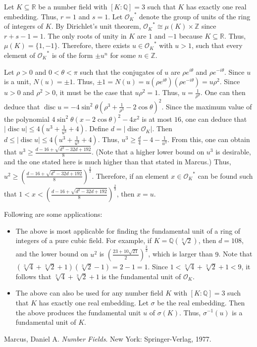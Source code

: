 \documentclass[12pt]{article}
\begin{document}
Let $K \subseteq \mathbb{R}$ be a number field with $[K\!:\!\mathbb{Q}]=3$ such that $K$ has exactly one real embedding.  Thus, $r=1$ and $s=1$.  Let ${\mathcal{O}_K}^*$ denote the group of units of the ring of integers of $K$.  By Dirichlet's unit theorem, ${\mathcal{O}_K}^* \cong \mu(K) \times \mathbb{Z}$ since $r+s-1=1$.  The only roots of unity in $K$ are $1$ and $-1$ because $K \subseteq \mathbb{R}$.  Thus, $\mu(K)=\{1,-1\}$.  Therefore, there exists $u \in {\mathcal{O}_K}^*$ with $u>1$, such that every element of ${\mathcal{O}_K}^*$ is of the form $\pm u^n$ for some $n \in \mathbb{Z}$.

Let $\rho>0$ and $0<\theta<\pi$ such that the conjugates of $u$ are $\rho e^{i\theta}$ and $\rho e^{-i\theta}$.  Since $u$ is a unit, $N(u)=\pm 1$.  Thus, $\pm 1=N(u)=u(\rho e^{i\theta})(\rho e^{-i\theta})=u\rho^2$.  Since $u>0$ and $\rho^2>0$, it must be the case that $u\rho^2=1$.  Thus, $\displaystyle u=\frac{1}{\rho^2}$.  One can then deduce that $\displaystyle \operatorname{disc}u=-4\sin^2\theta\left(\rho^3+\frac{1}{\rho^3}- 2\cos\theta\right)^2$.  Since the maximum value of the polynomial $4\sin^2\theta(x-2\cos\theta)^2-4x^2$ is at most $16$, one can deduce that $\displaystyle |\operatorname{disc}u| \le 4\left(u^3+\frac{1}{u^3}+4\right)$.  Define $d=|\operatorname{disc}\mathcal{O}_K|$.  Then $\displaystyle d\le|\operatorname{disc}u| \le 4\left(u^3+\frac{1}{u^3}+4\right)$.  Thus, $\displaystyle u^3 \ge \frac{d}{4}-4-\frac{1}{u^3}$.  From this, one can obtain that $\displaystyle u^3 \ge \frac{d-16+\sqrt{d^2-32d+192}}{8}$.  (Note that a higher lower bound on $u^3$ is desirable, and the one stated here is much higher than that stated in Marcus.)  Thus, $\displaystyle u^2 \ge \left( \frac{d-16+\sqrt{d^2-32d+192}}{8} \right)^{\frac{2}{3}}$.  Therefore, if an element $x \in {\mathcal{O}_K}^*$ can be found such that $\displaystyle 1<x<\left( \frac{d-16+\sqrt{d^2-32d+192}}{8} \right)^{\frac{2}{3}}$, then $x=u$.

Following are some applications:

\begin{itemize}
\item The above is most applicable for finding the fundamental unit of a ring of integers of a pure cubic field.  For example, if $K=\mathbb{Q}(\sqrt[3]{2})$, then $d=108$, and the lower bound on $u^2$ is $\displaystyle \left( \frac{23+10\sqrt{21}}{2} \right)^{\frac{2}{3}}$, which is larger than $9$.  Note that $\displaystyle \left( \sqrt[3]{4}+\sqrt[3]{2}+1 \right) \left( \sqrt[3]{2}-1 \right)=2-1=1$.  Since $1<\sqrt[3]{4}+\sqrt[3]{2}+1<9$, it follows that $\sqrt[3]{4}+\sqrt[3]{2}+1$ is the fundamental unit of $\mathcal{O}_K$.
\item The above can also be used for any number field $K$ with $[K\!:\!\mathbb{Q}]=3$ such that $K$ has exactly one real embedding.  Let $\sigma$ be the real embedding.  Then the above produces the fundamental unit $u$ of $\sigma(K)$.  Thus, $\sigma^{-1}(u)$ is a fundamental unit of $K$.
\end{itemize}

\begin{thebibliography}{9}
 Marcus, Daniel A. {\em Number Fields}. New York: Springer-Verlag, 1977.
\end{thebibliography}
\end{document}
